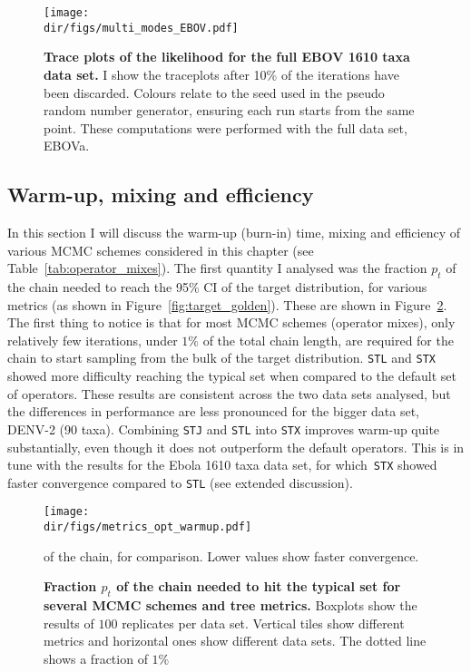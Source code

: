 \begin{figure}[!ht]
\begin{center}
\texttt{[image: \\dir/figs/multi\_modes\_EBOV.pdf]} 
\end{center}
 \caption[Trace plots of the likelihood for the full EBOV 1610 taxa data set.]{\textbf{Trace plots of the likelihood for the full EBOV 1610 taxa data set.}
 I show the traceplots after 10\% of the iterations have been discarded.
 Colours relate to the seed used in the pseudo random number generator, ensuring each run starts from the same point. 
 These computations were performed with the full data set, EBOVa.
 }
 \label{fig:ebovmultimod}
\end{figure}

\subsection{Warm-up, mixing and efficiency}
\label{sec:mcmc_efficiency}

In this section I will discuss the warm-up (burn-in) time, mixing and efficiency of various MCMC schemes considered in this chapter (see Table~\ref{tab:operator_mixes}).
The first quantity I analysed was the fraction $p_t$ of the chain needed to reach the 95\% CI of the target distribution, for various metrics (as shown in Figure~\ref{fig:target_golden}).
These are shown in Figure~\ref{fig:fractions_metrics}.
The first thing to notice is that for most MCMC schemes (operator mixes), only relatively few iterations, under $1\%$ of the total chain length, are required for the chain to start sampling from the bulk of the target distribution.
\verb|STL| and \verb|STX| showed more difficulty reaching the typical set when compared to the default set of operators.
These results are consistent across the two data sets analysed, but the differences in performance are less pronounced for the bigger data set, DENV-2 (90 taxa).
Combining \verb|STJ| and \verb|STL| into \verb|STX| improves warm-up quite substantially, even though it does not outperform the default operators.
This is in tune with the results for the Ebola 1610 taxa data set, for which~\verb|STX| showed faster convergence compared to \verb|STL| (see extended discussion).
\begin{figure}[!ht]
\begin{center}
\texttt{[image: \\dir/figs/metrics\_opt\_warmup.pdf]} 
\end{center}
 \caption[Fraction $p_t$ of the chain needed to hit the typical set (95\% CI) for several MCMC schemes and tree metrics.]{\textbf{Fraction $p_t$ of the chain needed to hit the typical set for several MCMC schemes and tree metrics.}
  Boxplots show the results of $100$ replicates per data set.
  Vertical tiles show different metrics and horizontal ones show different data sets.
  The dotted line shows a fraction of $1\%$ 
  }
of the chain, for comparison.
  Lower values show faster convergence.
 \label{fig:fractions_metrics}
\end{figure}


